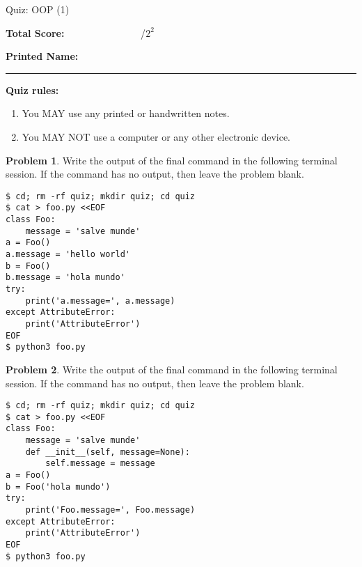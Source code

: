 \documentclass[10pt]{article}
\theoremstyle{definition}
\newtheorem{problem}{Problem}
\begin{document}
\begin{center}
    {
\Large
    Quiz: OOP (1)
}


    \vspace{0.1in}
\end{center}

\vspace{0.15in}
\noindent
\textbf{Total Score:} ~~~~~~~~~~~~~~~/$2^2$

\vspace{0.2in}
\noindent
\textbf{Printed Name:}

\noindent
\rule{\textwidth}{0.1pt}
\vspace{0.15in}

\noindent
\textbf{Quiz rules:}
\begin{enumerate}
    \item You MAY use any printed or handwritten notes.
    \item You MAY NOT use a computer or any other electronic device.
\end{enumerate}

\noindent

\vspace{0.15in}

\filbreak
\begin{problem}
    Write the output of the final command in the following terminal session.
    If the command has no output, then leave the problem blank.
\end{problem}
\begin{lstlisting}
$ cd; rm -rf quiz; mkdir quiz; cd quiz
$ cat > foo.py <<EOF
class Foo:
    message = 'salve munde'
a = Foo()
a.message = 'hello world'
b = Foo()
b.message = 'hola mundo'
try:
    print('a.message=', a.message)
except AttributeError:
    print('AttributeError') 
EOF
$ python3 foo.py
\end{lstlisting}

\filbreak
\begin{problem}
    Write the output of the final command in the following terminal session.
    If the command has no output, then leave the problem blank.
\end{problem}
\begin{lstlisting}
$ cd; rm -rf quiz; mkdir quiz; cd quiz
$ cat > foo.py <<EOF
class Foo:
    message = 'salve munde'
    def __init__(self, message=None):
        self.message = message
a = Foo()
b = Foo('hola mundo')
try:
    print('Foo.message=', Foo.message)
except AttributeError:
    print('AttributeError') 
EOF
$ python3 foo.py
\end{lstlisting}
\end{document}
